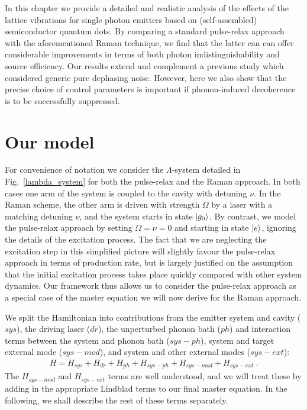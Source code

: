 In this chapter we provide a detailed and realistic analysis of the effects of the lattice vibrations for single photon emitters based on (self-assembled) semiconductor quantum dots. By comparing a standard pulse-relax approach with the aforementioned Raman technique, we find that the latter can can offer considerable improvements in terms of both photon indistinguishability and source efficiency. Our results extend and complement a previous study \cite{santori:2009} which considered generic pure dephasing noise. However, here we also show that the precise choice of control parameters is important if phonon-induced decoherence is to be successfully suppressed.

\section{Our model}


For convenience of notation we consider the $\Lambda$-system detailed in Fig.~\ref{lambda_system} for both the pulse-relax and the Raman approach. 
In both cases one arm of the system is coupled to the cavity with detuning $\nu$. %
In the Raman scheme, the other arm is driven with strength $\Omega$ by a laser with a matching detuning $\nu$, and the system starts in state $\left\vert g_0\right\rangle$. By contrast, we model the pulse-relax approach by setting $\Omega = \nu = 0$ and starting in state $\left\vert e\right\rangle$, ignoring the details of the excitation process. The fact that we are neglecting the excitation step in this simplified picture will slightly favour the pulse-relax approach in terms of production rate, but is largely justified on the assumption that the initial excitation process takes place quickly compared with other system dynamics. Our framework thus allows us to consider the pulse-relax approach as a special case of the master equation we will now derive for the Raman approach.

We split the Hamiltonian into contributions from the emitter system and cavity ($sys$), the driving laser ($dr$), the unperturbed phonon bath ($ph$) and interaction terms between the system and phonon bath ($sys-ph$), system and target external mode ($sys-mod$), and system and other external modes ($sys-ext$):
\begin{eqnarray}
  H = H_{sys} + H_{dr} + H_{ph} + H_{sys-ph} + H_{sys-mod} + H_{sys-ext}~.
\end{eqnarray}
The $H_{sys-mod}$ and $H_{sys-ext}$ terms are well understood, and we will treat these by adding in the appropriate Lindblad terms to our final master equation. In the following, we shall describe the rest of these terms separately. 

